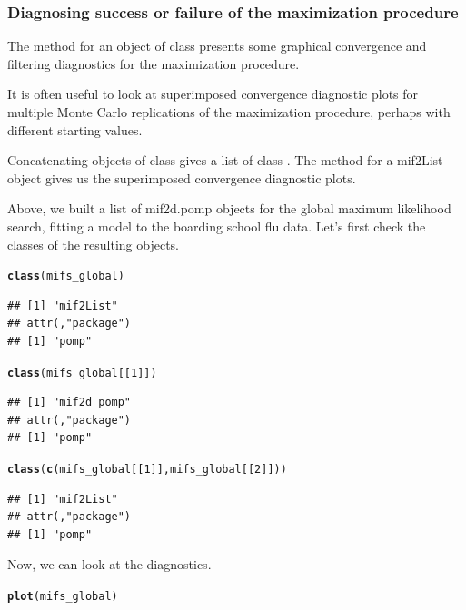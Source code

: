 \documentclass{beamer}\usepackage[]{graphicx}\usepackage[]{color}
\makeatletter
\newcommand{\hlnum}[1]{\textcolor[rgb]{0.686,0.059,0.569}{#1}}%
\newcommand{\hlstd}[1]{\textcolor[rgb]{0.345,0.345,0.345}{#1}}%
\newcommand{\hlkwd}[1]{\textcolor[rgb]{0.737,0.353,0.396}{\textbf{#1}}}%
\newenvironment{kframe}{%
 \def\at@end@of@kframe{}%
 \ifinner\ifhmode%
  \def\at@end@of@kframe{\end{minipage}}%
  \begin{minipage}{\columnwidth}%
 \fi\fi%
 \def\FrameCommand##1{\hskip\@totalleftmargin \hskip-\fboxsep
 \colorbox{shadecolor}{##1}\hskip-\fboxsep
     \hskip-\linewidth \hskip-\@totalleftmargin \hskip\columnwidth}%
 \MakeFramed {\advance\hsize-\width
   \@totalleftmargin\z@ \linewidth\hsize
   \@setminipage}}%
 {\par\unskip\endMakeFramed%
 \at@end@of@kframe}
\newenvironment{knitrout}{}{} %
\makeatother
\begin{document}
\begin{frame}[fragile]

\frametitle{Diagnosing success or failure of the maximization procedure}
\bi

\item  The  method for an object of class  presents some graphical convergence and filtering diagnostics for the maximization procedure.

\item  It is often useful to look at superimposed convergence diagnostic plots for multiple Monte Carlo replications of the maximization procedure, perhaps with different starting values.

\item  Concatenating objects of class  gives a list of class . The  method for a mif2List object gives us the superimposed convergence diagnostic plots.

\item  Above, we built a list of mif2d.pomp objects for the global maximum likelihood search, fitting a model to the boarding school flu data. Let's first check the classes of the resulting objects.
\ei

\begin{knitrout}\small
{}\color{fgcolor}\begin{kframe}
\begin{alltt}
\hlkwd{class}\hlstd{(mifs_global)}
\end{alltt}
\begin{verbatim}
## [1] "mif2List"
## attr(,"package")
## [1] "pomp"
\end{verbatim}
\begin{alltt}
\hlkwd{class}\hlstd{(mifs_global[[}\hlnum{1}\hlstd{]])}
\end{alltt}
\begin{verbatim}
## [1] "mif2d_pomp"
## attr(,"package")
## [1] "pomp"
\end{verbatim}
\begin{alltt}
\hlkwd{class}\hlstd{(}\hlkwd{c}\hlstd{(mifs_global[[}\hlnum{1}\hlstd{]],mifs_global[[}\hlnum{2}\hlstd{]]))}
\end{alltt}
\begin{verbatim}
## [1] "mif2List"
## attr(,"package")
## [1] "pomp"
\end{verbatim}
\end{kframe}
\end{knitrout}
\bi
\item  Now, we can look at the diagnostics.
\ei
\begin{knitrout}\small
{}\color{fgcolor}\begin{kframe}
\begin{alltt}
\hlkwd{plot}\hlstd{(mifs_global)}
\end{alltt}
\end{kframe}


\end{knitrout}
\end{frame}
\end{document}
